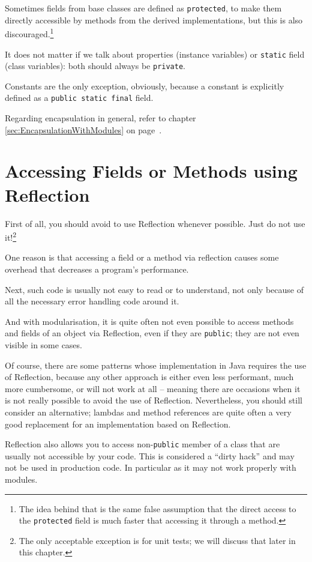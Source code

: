 \documentclass[11pt,a4paper, titlepage, parskip=half, headsepline, footsepline, cleardoublepage=current, headheight=1cm]{scrbook}
\newcommand*{\tqvref}[1]{\hyperref[{#1}]{\ref*{#1}} on page~\pageref{#1}}
\begin{document}
Sometimes fields from base classes are defined as \lstinline|protected|, to make them directly accessible by methods from the derived implementations, but this is also discouraged.\footnote{The idea behind that is the same false assumption that the direct access to the \lstinline|protected| field is much faster that accessing it through a method.}

It does not matter if we talk about properties (instance variables) or \lstinline|static| field (class variables): both should always be \lstinline|private|.

Constants are the only exception, obviously, because a constant is explicitly defined as a \lstinline|public static final| field.

Regarding encapsulation in general, refer to chapter \tqvref{sec:EncapsulationWithModules}.

\section{Accessing Fields or Methods using Reflection}
First of all, you should avoid to use Reflection whenever possible. Just do not use it!\footnote{The only acceptable exception is for unit tests; we will discuss that later in this chapter.}

One reason is that accessing a field or a method via reflection causes some overhead that decreases a program’s performance. 

Next, such code is usually not easy to read or to understand, not only because of all the necessary error handling code around it.

And with modularisation, it is quite often not even possible to access methods and fields of an object via Reflection, even if they are \lstinline|public|; they are not even visible in some cases.

Of course, there are some patterns whose implementation in Java requires the use of Reflection, because any other approach is either even less performant, much more cumbersome, or will not work at all – meaning there are occasions when it is not really possible to avoid the use of Reflection. Nevertheless, you should still consider an alternative; lambdas\autocite{ORACLE_DOC_LANGUAGE_SPECIFICATION:LambdaExpressions} and method references\autocite{ORACLE_DOC_LANGUAGE_SPECIFICATION:MethodReference} are quite often a very good replacement for an implementation based on Reflection.

Reflection also allows you to access non-\lstinline|public| member of a class that are usually not accessible by your code. This is considered a “dirty hack” and may not be used in production code. In particular as it may not work properly with modules.
\end{document}
